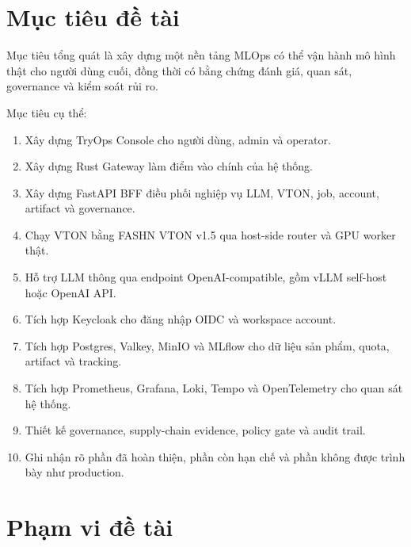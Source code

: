\documentclass[12pt,a4paper,oneside]{report}
\begin{document}
\section{Mục tiêu đề tài}

Mục tiêu tổng quát là xây dựng một nền tảng MLOps có thể vận hành mô hình thật cho người dùng cuối, đồng thời có bằng chứng đánh giá, quan sát, governance và kiểm soát rủi ro.

Mục tiêu cụ thể:

\begin{enumerate}
  \item Xây dựng TryOps Console cho người dùng, admin và operator.
  \item Xây dựng Rust Gateway làm điểm vào chính của hệ thống.
  \item Xây dựng FastAPI BFF điều phối nghiệp vụ LLM, VTON, job, account, artifact và governance.
  \item Chạy VTON bằng FASHN VTON v1.5 qua host-side router và GPU worker thật.
  \item Hỗ trợ LLM thông qua endpoint OpenAI-compatible, gồm vLLM self-host hoặc OpenAI API.
  \item Tích hợp Keycloak cho đăng nhập OIDC và workspace account.
  \item Tích hợp Postgres, Valkey, MinIO và MLflow cho dữ liệu sản phẩm, quota, artifact và tracking.
  \item Tích hợp Prometheus, Grafana, Loki, Tempo và OpenTelemetry cho quan sát hệ thống.
  \item Thiết kế governance, supply-chain evidence, policy gate và audit trail.
  \item Ghi nhận rõ phần đã hoàn thiện, phần còn hạn chế và phần không được trình bày như production.
\end{enumerate}

\section{Phạm vi đề tài}
\end{document}

